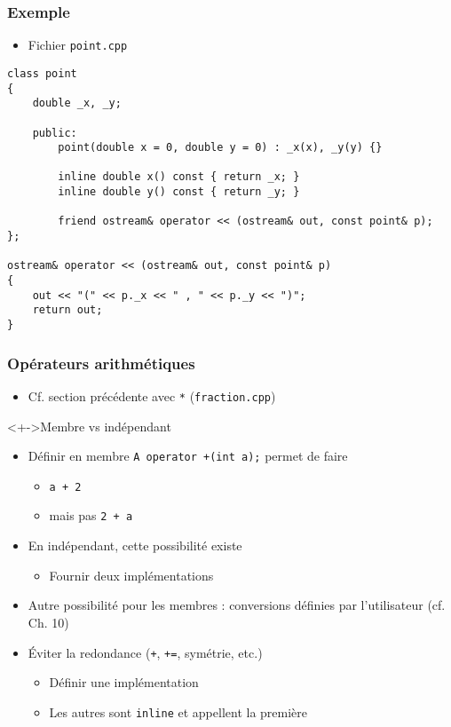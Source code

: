 \begin{frame}[containsverbatim]
\frametitle{Exemple}
\begin{itemize}
\item Fichier \texttt{point.cpp}
\end{itemize}
\begin{lstlisting}
class point
{
	double _x, _y;

	public:
		point(double x = 0, double y = 0) : _x(x), _y(y) {}

		inline double x() const { return _x; }
		inline double y() const { return _y; }

		friend ostream& operator << (ostream& out, const point& p);
};

ostream& operator << (ostream& out, const point& p)
{
	out << "(" << p._x << " , " << p._y << ")";
	return out;
}
\end{lstlisting}
\end{frame}

\begin{frame}
\frametitle{Opérateurs arithmétiques}
\begin{itemize}[<+->]
\item Cf. section précédente avec \texttt{*} (\texttt{fraction.cpp})
\end{itemize}
\begin{exampleblock}<+->{Membre vs indépendant}
	\begin{itemize}[<+->]
	\item Définir en membre \lstinline|A operator +(int a);| permet de faire
		\begin{itemize}
		\item \texttt{a + 2} 
		\item mais pas \texttt{2 + a}
		\end{itemize}
	\item En indépendant, cette possibilité existe
		\begin{itemize}
		\item Fournir deux implémentations
		\end{itemize}
	\item Autre possibilité pour les membres : conversions définies par l'utilisateur (cf. Ch. 10)
	\end{itemize}
\end{exampleblock}
\begin{itemize}[<+->]
\item Éviter la redondance (\texttt{+}, \texttt{+=}, symétrie, etc.)
	\begin{itemize}
	\item Définir une implémentation
	\item Les autres sont \lstinline|inline| et appellent la première
	\end{itemize}
\end{itemize}
\end{frame}

